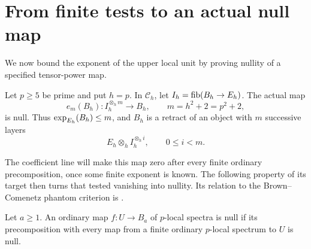 \section{From finite tests to an actual null map}\label{sec:upper-nullity}

We now bound the exponent of the upper local unit by proving nullity
of a specified tensor-power map.

\begin{proposition}
\label{wup:upper-null}
Let \(p\geq5\) be prime and put \(h=p\). In \(\mathcal C_h\), let
\(I_h=\operatorname{fib}(B_h\to E_h)\). The actual map
\[
 e_m(B_h):I_h^{\otimes_h m}\longrightarrow B_h,
 \qquad m=h^2+2=p^2+2,
\]
is null. Thus \(\operatorname{exp}_{E_h}(B_h)\leq m\), and \(B_h\) is a retract
of an object with \(m\) successive layers
\[
 E_h\otimes_h I_h^{\otimes_h i},\qquad 0\leq i<m.
\]
\end{proposition}

The coefficient line will make this map zero after every finite ordinary
precomposition, once some finite exponent is known. The following
property of its target then turns that tested vanishing into nullity.
Its relation to the Brown--Comenetz phantom criterion is
\cite[Proposition~4.11]{christensen-strickland1998}.

\begin{lemma}\label{wup:phantom}
Let \(a\geq1\). An ordinary map \(f:U\to B_a\) of \(p\)-local
spectra is null if its precomposition with every map from a finite
ordinary \(p\)-local spectrum to \(U\) is null.
\end{lemma}

